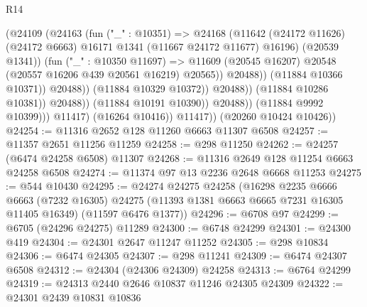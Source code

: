 \begin{lexlean}{R14}
\begin{coremodule}
                                            (@24109
                                              (@24163
                                                (fun ("_" : @10351) =>
                                                @24168
                                                  (@11642
                                                    (@24172 @11626)
                                                    (@24172 @6663)
                                                    @16171
                                                    @1341
                                                    (@11667 @24172 @11677)
                                                    @16196)
                                                  (@20539 @1341))
                                                (fun ("_" : @10350 @11697) =>
                                                @11609
                                                  (@20545 @16207)
                                                  @20548
                                                  (@20557 @16206 @439 @20561 @16219)
                                                  @20565))
                                              @20488))
                                          (@11884 @10366 @10371))
                                        @20488))
                                    (@11884 @10329 @10372))
                                  @20488))
                              (@11884 @10286 @10381))
                            @20488))
                        (@11884 @10191 @10390))
                      @20488))
                  (@11884 @9992 @10399)))
              @11417)
            (@16264 @10416))
          @11417))
      (@20260 @10424 @10426))
@24254 := @11316 @2652 @128 @11260 @6663 @11307 @6508
@24257 := @11357 @2651 @11256 @11259
@24258 := @298 @11250
@24262 := @24257 (@6474 @24258 @6508) @11307
@24268 := @11316 @2649 @128 @11254 @6663 @24258 @6508
@24274 := @11374 @97 @13 @2236 @2648 @6668 @11253
@24275 := @544 @10430
@24295 := @24274
    @24275
    @24258
    (@16298
      @2235
      @6666
      @6663
      (@7232 @16305)
      @24275
      (@11393 @1381 @6663 @6665 @7231 @16305 @11405 @16349)
      (@11597 @6476 @1377))
@24296 := @6708 @97
@24299 := @6705 (@24296 @24275) @11289
@24300 := @6748 @24299
@24301 := @24300 @419
@24304 := @24301 @2647 @11247 @11252
@24305 := @298 @10834
@24306 := @6474 @24305
@24307 := @298 @11241
@24309 := @6474 @24307 @6508
@24312 := @24304 (@24306 @24309) @24258
@24313 := @6764 @24299
@24319 := @24313 @2440 @2646 @10837 @11246 @24305 @24309
@24322 := @24301 @2439 @10831 @10836

\end{coremodule}
\end{lexlean}
